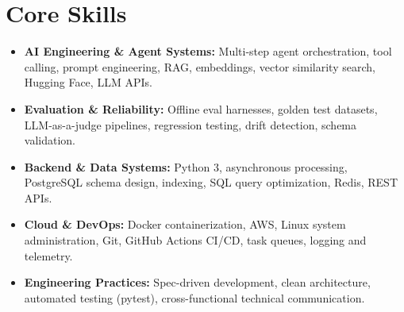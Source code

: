 \documentclass[a4paper,10pt]{article}
\begin{document}
\section{Core Skills}
\begin{itemize}
 \item \textbf{AI Engineering \& Agent Systems:} Multi-step agent orchestration, tool calling, prompt engineering, RAG, embeddings, vector similarity search, Hugging Face, LLM APIs.
 \item \textbf{Evaluation \& Reliability:} Offline eval harnesses, golden test datasets, LLM-as-a-judge pipelines, regression testing, drift detection, schema validation.
 \item \textbf{Backend \& Data Systems:} Python 3, asynchronous processing, PostgreSQL schema design, indexing, SQL query optimization, Redis, REST APIs.
 \item \textbf{Cloud \& DevOps:} Docker containerization, AWS, Linux system administration, Git, GitHub Actions CI/CD, task queues, logging and telemetry.
 \item \textbf{Engineering Practices:} Spec-driven development, clean architecture, automated testing (pytest), cross-functional technical communication.
\end{itemize}
\end{document}
